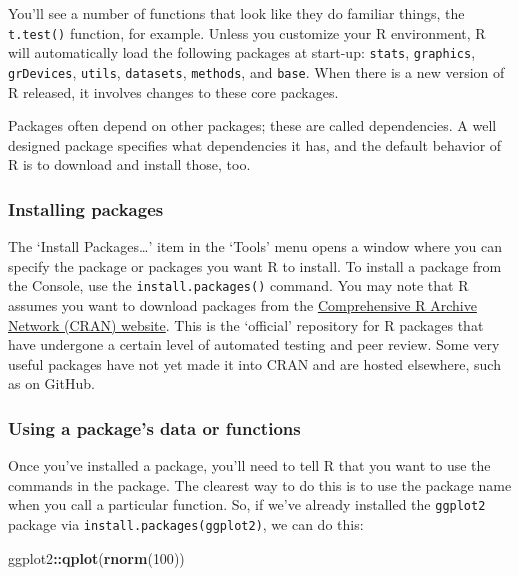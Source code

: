 \documentclass[]{article}
\newenvironment{Shaded}{\begin{snugshade}}{\end{snugshade}}
\newcommand{\KeywordTok}[1]{\textcolor[rgb]{0.13,0.29,0.53}{\textbf{#1}}}
\newcommand{\DecValTok}[1]{\textcolor[rgb]{0.00,0.00,0.81}{#1}}
\newcommand{\OperatorTok}[1]{\textcolor[rgb]{0.81,0.36,0.00}{\textbf{#1}}}
\newcommand{\NormalTok}[1]{#1}
\begin{document}
You'll see a number of functions that look like they do familiar things,
the \texttt{t.test()} function, for example. Unless you customize your R
environment, R will automatically load the following packages at
start-up: \texttt{stats}, \texttt{graphics}, \texttt{grDevices},
\texttt{utils}, \texttt{datasets}, \texttt{methods}, and \texttt{base}.
When there is a new version of R released, it involves changes to these
core packages.

Packages often depend on other packages; these are called dependencies.
A well designed package specifies what dependencies it has, and the
default behavior of R is to download and install those, too.

\subsubsection{Installing packages}\label{installing-packages}

The `Install Packages\ldots{}' item in the `Tools' menu opens a window
where you can specify the package or packages you want R to install. To
install a package from the Console, use the \texttt{install.packages()}
command. You may note that R assumes you want to download packages from
the \href{https://cran.r-project.org/}{Comprehensive R Archive Network
(CRAN) website}. This is the `official' repository for R packages that
have undergone a certain level of automated testing and peer review.
Some very useful packages have not yet made it into CRAN and are hosted
elsewhere, such as on GitHub.

\subsubsection{Using a package's data or
functions}\label{using-a-packages-data-or-functions}

Once you've installed a package, you'll need to tell R that you want to
use the commands in the package. The clearest way to do this is to use
the package name when you call a particular function. So, if we've
already installed the \texttt{ggplot2} package via
\texttt{install.packages(\textquotesingle{}ggplot2\textquotesingle{})},
we can do this:

\begin{Shaded}
\begin{Highlighting}[]
\NormalTok{ggplot2}\OperatorTok{::}\KeywordTok{qplot}\NormalTok{(}\KeywordTok{rnorm}\NormalTok{(}\DecValTok{100}\NormalTok{))}
\end{Highlighting}
\end{Shaded}
\end{document}
